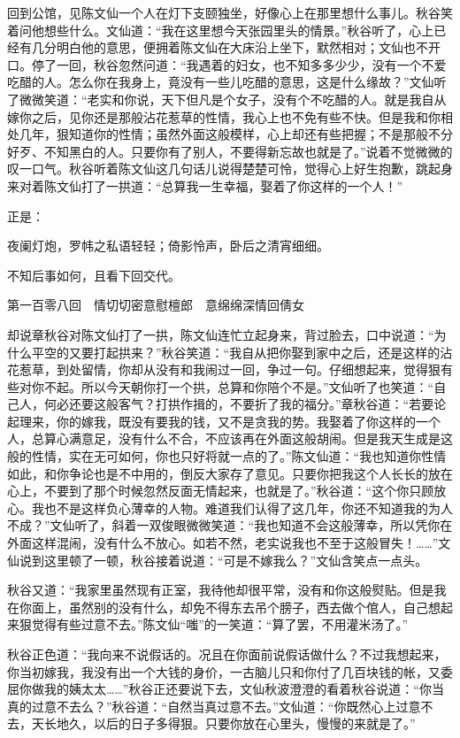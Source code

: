 \documentclass[12pt,UTF8]{ctexbook}
\begin{document}
{{{回到公馆，见陈文仙一个人在灯下支颐独坐，好像心上在那里想什么事儿。秋谷笑着问他想些什么。文仙道：“我在这里想今天张园里头的情景。”秋谷听了，心上已经有几分明白他的意思，便拥着陈文仙在大床沿上坐下，默然相对；文仙也不开口。停了一回，秋谷忽然问道：“我遇着的妇女，也不知多多少少，没有一个不爱吃醋的人。怎么你在我身上，竟没有一些儿吃醋的意思，这是什么缘故？”文仙听了微微笑道：“老实和你说，天下但凡是个女子，没有个不吃醋的人。就是我自从嫁你之后，见你还是那般沾花惹草的性情，我心上也不免有些不快。但是我和你相处几年，狠知道你的性情；虽然外面这般模样，心上却还有些把握；不是那般不分好歹、不知黑白的人。只要你有了别人，不要得新忘故也就是了。”说着不觉微微的叹一口气。秋谷听着陈文仙这几句话儿说得楚楚可怜，觉得心上好生抱歉，跳起身来对着陈文仙打了一拱道：“总算我一生幸福，娶着了你这样的一个人！”

正是：

夜阑灯炮，罗帏之私语轻轻；倚影怜声，卧后之清宵细细。

不知后事如何，且看下回交代。





第一百零八回　情切切密意慰檀郎　意绵绵深情回倩女





却说章秋谷对陈文仙打了一拱，陈文仙连忙立起身来，背过脸去，口中说道：“为什么平空的又要打起拱来？”秋谷笑道：“我自从把你娶到家中之后，还是这样的沾花惹草，到处留情，你却从没有和我闹过一回，争过一句。仔细想起来，觉得狠有些对你不起。所以今天朝你打一个拱，总算和你陪个不是。”文仙听了也笑道：“自己人，何必还要这般客气？打拱作揖的，不要折了我的福分。”章秋谷道：“若要论起理来，你的嫁我，既没有要我的钱，又不是贪我的势。我娶着了你这样的一个人，总算心满意足，没有什么不合，不应该再在外面这般胡闹。但是我天生成是这般的性情，实在无可如何，你也只好将就一点的了。”陈文仙道：“我也知道你性情如此，和你争论也是不中用的，倒反大家存了意见。只要你把我这个人长长的放在心上，不要到了那个时候忽然反面无情起来，也就是了。”秋谷道：“这个你只顾放心。我也不是这样负心薄幸的人物。难道我们认得了这几年，你还不知道我的为人不成？”文仙听了，斜着一双俊眼微微笑道：“我也知道不会这般薄幸，所以凭你在外面这样混闹，没有什么不放心。如若不然，老实说我也不至于这般冒失！……”文仙说到这里顿了一顿，秋谷接着说道：“可是不嫁我么？”文仙含笑点一点头。

秋谷又道：“我家里虽然现有正室，我待他却很平常，没有和你这般熨贴。但是我在你面上，虽然别的没有什么，却免不得东去吊个膀子，西去做个倌人，自己想起来狠觉得有些过意不去。”陈文仙“嗤”的一笑道：“算了罢，不用灌米汤了。”

秋谷正色道：“我向来不说假话的。况且在你面前说假话做什么？不过我想起来，你当初嫁我，我没有出一个大钱的身价，一古脑儿只和你付了几百块钱的帐，又委屈你做我的姨太太……”秋谷正还要说下去，文仙秋波澄澄的看着秋谷说道：“你当真的过意不去么？”秋谷道：“自然当真过意不去。”文仙道：“你既然心上过意不去，天长地久，以后的日子多得狠。只要你放在心里头，慢慢的来就是了。”

}}}
\end{document}
